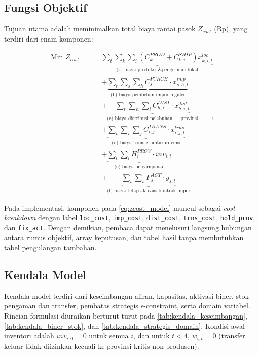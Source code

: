 \documentclass{file/TA-ITS}
\theoremstyle{definition}
\theoremstyle{definition}
\theoremstyle{plain}
\begin{document}
\subsection{Fungsi Objektif}

Tujuan utama adalah meminimalkan total biaya rantai pasok $Z_{cost}$ (Rp), yang terdiri dari enam komponen:

\begin{align}
\text{Min } Z_{cost} = \quad
& \underbrace{\sum_{t} \sum_{k} \sum_{i}
    \left( C^{PROD}_k + C^{SHIP}_{k,i} \right) x^{loc}_{k,i,t}}_{\text{(a) biaya produksi \& pengiriman lokal}}
    \nonumber \\
& + \underbrace{\sum_{t} \sum_{s} \sum_{h}
    C^{PURCH}_s \cdot x^{imp}_{s,h,t}}_{\text{(b) biaya pembelian impor reguler}}
    \nonumber \\
& + \underbrace{\sum_{t} \sum_{h} \sum_{i}
    C^{DIST}_{h,i} \cdot x^{dist}_{h,i,t}}_{\text{(c) biaya distribusi pelabuhan $\to$ provinsi}}
    \nonumber \\
& + \underbrace{\sum_{t} \sum_{i} \sum_{j}
    C^{TRANS}_{i,j} \cdot x^{trns}_{i,j,t}}_{\text{(d) biaya transfer antarprovinsi}}
    \nonumber \\
& + \underbrace{\sum_{t} \sum_{i}
    H^{PROV}_i \cdot inv_{i,t}}_{\text{(e) biaya penyimpanan}}
    \nonumber \\
& + \underbrace{\sum_{t} \sum_{s}
    F^{ACT}_s \cdot y_{s,t}}_{\text{(f) biaya tetap aktivasi kontrak impor}}
\label{eq:zcost_model}
\end{align}

Pada implementasi, komponen pada \ref{eq:zcost_model} muncul sebagai \textit{cost breakdown} dengan label \texttt{loc\_cost}, \texttt{imp\_cost}, \texttt{dist\_cost}, \texttt{trns\_cost}, \texttt{hold\_prov}, dan \texttt{fix\_act}. Dengan demikian, pembaca dapat menelusuri langsung hubungan antara rumus objektif, array keputusan, dan tabel hasil tanpa membutuhkan tabel pengulangan tambahan.

\subsection{Kendala Model}

Kendala model terdiri dari keseimbangan aliran, kapasitas, aktivasi biner, stok pengaman dan transfer, pembatas strategis \(\epsilon\)-constraint, serta domain variabel. Rincian formulasi diuraikan berturut-turut pada \ref{tab:kendala_keseimbangan}, \ref{tab:kendala_biner_stok}, dan \ref{tab:kendala_strategis_domain}. Kondisi awal inventori adalah $inv_{i,0} = 0$ untuk semua $i$, dan untuk $t < 4$, $w_{i,t} = 0$ (transfer keluar tidak diizinkan kecuali ke provinsi kritis non-produsen).
\end{document}
